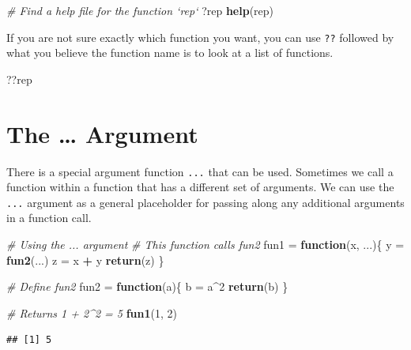 \documentclass[
]{book}
\newenvironment{Shaded}{\begin{snugshade}}{\end{snugshade}}
\newcommand{\CommentTok}[1]{\textcolor[rgb]{0.56,0.35,0.01}{\textit{#1}}}
\newcommand{\ControlFlowTok}[1]{\textcolor[rgb]{0.13,0.29,0.53}{\textbf{#1}}}
\newcommand{\DecValTok}[1]{\textcolor[rgb]{0.00,0.00,0.81}{#1}}
\newcommand{\KeywordTok}[1]{\textcolor[rgb]{0.13,0.29,0.53}{\textbf{#1}}}
\newcommand{\NormalTok}[1]{#1}
\newcommand{\OperatorTok}[1]{\textcolor[rgb]{0.81,0.36,0.00}{\textbf{#1}}}
\newcommand{\StringTok}[1]{\textcolor[rgb]{0.31,0.60,0.02}{#1}}
\begin{document}
\begin{Shaded}
\begin{Highlighting}[]
\CommentTok{# Find a help file for the function `rep`}
\NormalTok{?rep}
\KeywordTok{help}\NormalTok{(rep)}
\end{Highlighting}
\end{Shaded}

If you are not sure exactly which function you want, you can use \texttt{??} followed by what you believe the function name is to look at a list of functions.

\begin{Shaded}
\begin{Highlighting}[]
\NormalTok{??rep}
\end{Highlighting}
\end{Shaded}

\hypertarget{the-argument}{%
\section{The \ldots{} Argument}\label{the-argument}}

There is a special argument function \texttt{...} that can be used. Sometimes we call a function within a function that has a different set of arguments. We can use the \texttt{...} argument as a general placeholder for passing along any additional arguments in a function call.

\begin{Shaded}
\begin{Highlighting}[]
\CommentTok{# Using the ... argument}
\CommentTok{# This function calls fun2}
\NormalTok{fun1 =}\StringTok{ }\ControlFlowTok{function}\NormalTok{(x, ...)\{}
\NormalTok{  y =}\StringTok{ }\KeywordTok{fun2}\NormalTok{(...)}
\NormalTok{  z =}\StringTok{ }\NormalTok{x }\OperatorTok{+}\StringTok{ }\NormalTok{y }
  \KeywordTok{return}\NormalTok{(z)}
\NormalTok{\}}

\CommentTok{# Define fun2 }
\NormalTok{fun2 =}\StringTok{ }\ControlFlowTok{function}\NormalTok{(a)\{}
\NormalTok{  b =}\StringTok{ }\NormalTok{a}\OperatorTok{^}\DecValTok{2}
  \KeywordTok{return}\NormalTok{(b)}
\NormalTok{\}}

\CommentTok{# Returns 1 + 2^2 = 5}
\KeywordTok{fun1}\NormalTok{(}\DecValTok{1}\NormalTok{, }\DecValTok{2}\NormalTok{)}
\end{Highlighting}
\end{Shaded}

\begin{verbatim}
## [1] 5
\end{verbatim}
\end{document}
